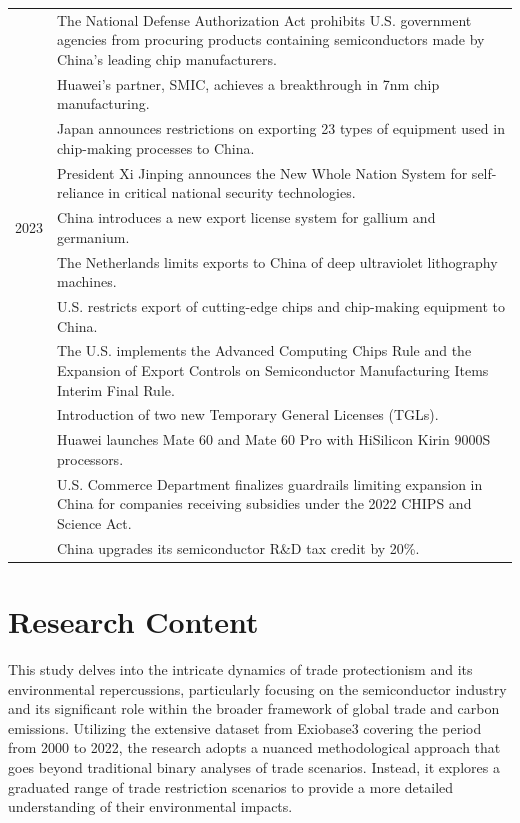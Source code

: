 \begin{table}
\begin{tabular}{|p{}|p{}|}
            & The National Defense Authorization Act prohibits U.S. government agencies from procuring products containing semiconductors made by China's leading chip manufacturers. \\
            & Huawei's partner, SMIC, achieves a breakthrough in 7nm chip manufacturing. \\
            & Japan announces restrictions on exporting 23 types of equipment used in chip-making processes to China. \\
            & President Xi Jinping announces the New Whole Nation System for self-reliance in critical national security technologies. \\
       2023 & China introduces a new export license system for gallium and germanium. \\
            & The Netherlands limits exports to China of deep ultraviolet lithography machines. \\
            & U.S. restricts export of cutting-edge chips and chip-making equipment to China. \\
            & The U.S. implements the Advanced Computing Chips Rule and the Expansion of Export Controls on Semiconductor Manufacturing Items Interim Final Rule. \\
            & Introduction of two new Temporary General Licenses (TGLs). \\
            & Huawei launches Mate 60 and Mate 60 Pro with HiSilicon Kirin 9000S processors. \\
            & U.S. Commerce Department finalizes guardrails limiting expansion in China for companies receiving subsidies under the 2022 CHIPS and Science Act. \\
            & China upgrades its semiconductor R\&D tax credit by 20\%. \\
   \bottomrule
   \end{tabular}
   \end{table}
   
\section{Research Content}

This study delves into the intricate dynamics of trade protectionism and its environmental repercussions, particularly focusing on the semiconductor industry and its significant role within the broader framework of global trade and carbon emissions. Utilizing the extensive dataset from Exiobase3 covering the period from 2000 to 2022, the research adopts a nuanced methodological approach that goes beyond traditional binary analyses of trade scenarios. Instead, it explores a graduated range of trade restriction scenarios to provide a more detailed understanding of their environmental impacts.

